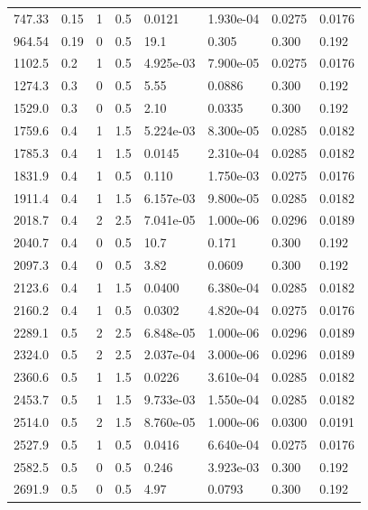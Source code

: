\documentclass[preview]{standalone}
\begin{document}
{{\begin{tabular}{L{1.2cm}C{1.2cm} C{0.3cm}C{0.5cm} C{1.4cm}C{1.4cm} C{1.4cm}C{1.4cm}}
  747.33  &  0.15  & 1     & 0.5 &  0.0121  & 1.930e-04  & 0.0275 &  0.0176   \\ 
  964.54  &  0.19  & 0     & 0.5 &  19.1  & 0.305  & 0.300 &  0.192   \\ 
  1102.5  &   0.2  & 1     & 0.5 &  4.925e-03  & 7.900e-05  & 0.0275 &  0.0176   \\ 
  1274.3  &   0.3  & 0     & 0.5 &  5.55  & 0.0886  & 0.300 &  0.192   \\ 
  1529.0  &   0.3  & 0     & 0.5 &  2.10  & 0.0335  & 0.300 &  0.192   \\ 
  1759.6  &   0.4  & 1     & 1.5 &  5.224e-03  & 8.300e-05  & 0.0285 &  0.0182   \\ 
  1785.3  &   0.4  & 1     & 1.5 &  0.0145  & 2.310e-04  & 0.0285 &  0.0182   \\ 
  1831.9  &   0.4  & 1     & 0.5 &  0.110  & 1.750e-03  & 0.0275 &  0.0176   \\ 
  1911.4  &   0.4  & 1     & 1.5 &  6.157e-03  & 9.800e-05  & 0.0285 &  0.0182   \\ 
  2018.7  &   0.4  & 2     & 2.5 &  7.041e-05  & 1.000e-06  & 0.0296 &  0.0189   \\ 
  2040.7  &   0.4  & 0     & 0.5 &  10.7  & 0.171  & 0.300 &  0.192   \\ 
  2097.3  &   0.4  & 0     & 0.5 &  3.82  & 0.0609  & 0.300 &  0.192   \\ 
  2123.6  &   0.4  & 1     & 1.5 &  0.0400  & 6.380e-04  & 0.0285 &  0.0182   \\ 
  2160.2  &   0.4  & 1     & 0.5 &  0.0302  & 4.820e-04  & 0.0275 &  0.0176   \\ 
  2289.1  &   0.5  & 2     & 2.5 &  6.848e-05  & 1.000e-06  & 0.0296 &  0.0189   \\ 
  2324.0  &   0.5  & 2     & 2.5 &  2.037e-04  & 3.000e-06  & 0.0296 &  0.0189   \\ 
  2360.6  &   0.5  & 1     & 1.5 &  0.0226  & 3.610e-04  & 0.0285 &  0.0182   \\ 
  2453.7  &   0.5  & 1     & 1.5 &  9.733e-03  & 1.550e-04  & 0.0285 &  0.0182   \\ 
  2514.0  &   0.5  & 2     & 1.5 &  8.760e-05  & 1.000e-06  & 0.0300 &  0.0191   \\ 
  2527.9  &   0.5  & 1     & 0.5 &  0.0416  & 6.640e-04  & 0.0275 &  0.0176   \\ 
  2582.5  &   0.5  & 0     & 0.5 &  0.246  & 3.923e-03  & 0.300 &  0.192   \\ 
  2691.9  &   0.5  & 0     & 0.5 &  4.97  & 0.0793  & 0.300 &  0.192   \\ 

\end{tabular}}}
\end{document}
